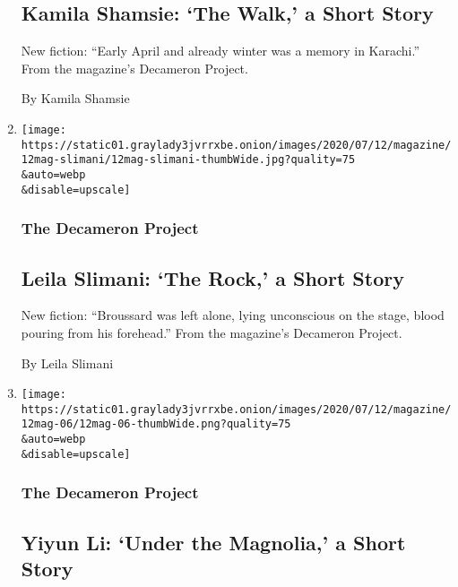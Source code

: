 \begin{enumerate}
  \hypertarget{kamila-shamsie-the-walk-a-short-story}{%
  \subsection{Kamila Shamsie: `The Walk,' a Short
  Story}\label{kamila-shamsie-the-walk-a-short-story}}

  New fiction: ``Early April and already winter was a memory in
  Karachi.'' From the magazine's Decameron Project.

  By Kamila Shamsie
\item
  \href{/interactive/2020/07/07/magazine/leila-slimani-short-story.html}{}

  \texttt{[image: https://static01.graylady3jvrrxbe.onion/images/2020/07/12/magazine/12mag-slimani/12mag-slimani-thumbWide.jpg?quality=75\\\&auto=webp\\\&disable=upscale]}

  \hypertarget{the-decameron-project-9}{%
  \subsubsection{The Decameron Project}\label{the-decameron-project-9}}

  \hypertarget{leila-slimani-the-rock-a-short-story}{%
  \subsection{Leila Slimani: `The Rock,' a Short
  Story}\label{leila-slimani-the-rock-a-short-story}}

  New fiction: ``Broussard was left alone, lying unconscious on the
  stage, blood pouring from his forehead.'' From the magazine's
  Decameron Project.

  By Leila Slimani
\item
  \href{/interactive/2020/07/07/magazine/yiyun-li-short-story.html}{}

  \texttt{[image: https://static01.graylady3jvrrxbe.onion/images/2020/07/12/magazine/12mag-06/12mag-06-thumbWide.png?quality=75\\\&auto=webp\\\&disable=upscale]}

  \hypertarget{the-decameron-project-10}{%
  \subsubsection{The Decameron Project}\label{the-decameron-project-10}}

  \hypertarget{yiyun-li-under-the-magnolia-a-short-story}{%
  \subsection{Yiyun Li: `Under the Magnolia,' a Short
  Story}\label{yiyun-li-under-the-magnolia-a-short-story}}


\end{enumerate}
